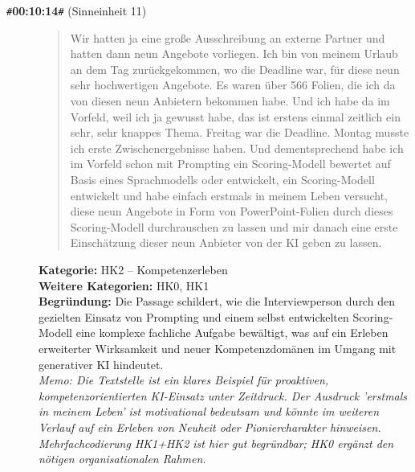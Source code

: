 \begin{description}
  \item[\texttt{\#}\textbf{00:10:14}\texttt{\#} (Sinneinheit 11)]
  \begin{quote}
  Wir hatten ja eine große Ausschreibung an externe Partner und hatten dann neun Angebote vorliegen. Ich bin von meinem Urlaub an dem Tag zurückgekommen, wo die Deadline war, für diese neun sehr hochwertigen Angebote. Es waren über 566 Folien, die ich da von diesen neun Anbietern bekommen habe. Und ich habe da im Vorfeld, weil ich ja gewusst habe, das ist erstens einmal zeitlich ein sehr, sehr knappes Thema. Freitag war die Deadline. Montag musste ich erste Zwischenergebnisse haben. Und dementsprechend habe ich im Vorfeld schon mit Prompting ein Scoring-Modell bewertet auf Basis eines Sprachmodells oder entwickelt, ein Scoring-Modell entwickelt und habe einfach erstmals in meinem Leben versucht, diese neun Angebote in Form von PowerPoint-Folien durch dieses Scoring-Modell durchrauschen zu lassen und mir danach eine erste Einschätzung dieser neun Anbieter von der KI geben zu lassen.
  \end{quote}
  \textbf{Kategorie:} HK2 -- Kompetenzerleben\\
  \textbf{Weitere Kategorien:} HK0, HK1\\
  \textbf{Begr\"undung:} Die Passage schildert, wie die Interviewperson durch den gezielten Einsatz von Prompting und einem selbst entwickelten Scoring-Modell eine komplexe fachliche Aufgabe bewältigt, was auf ein Erleben erweiterter Wirksamkeit und neuer Kompetenzdomänen im Umgang mit generativer KI hindeutet.
  \\\textit{Memo: Die Textstelle ist ein klares Beispiel für proaktiven, kompetenzorientierten KI-Einsatz unter Zeitdruck. Der Ausdruck 'erstmals in meinem Leben' ist motivational bedeutsam und könnte im weiteren Verlauf auf ein Erleben von Neuheit oder Pioniercharakter hinweisen. Mehrfachcodierung HK1+HK2 ist hier gut begründbar; HK0 ergänzt den nötigen organisationalen Rahmen.}
\end{description}
\medskip

